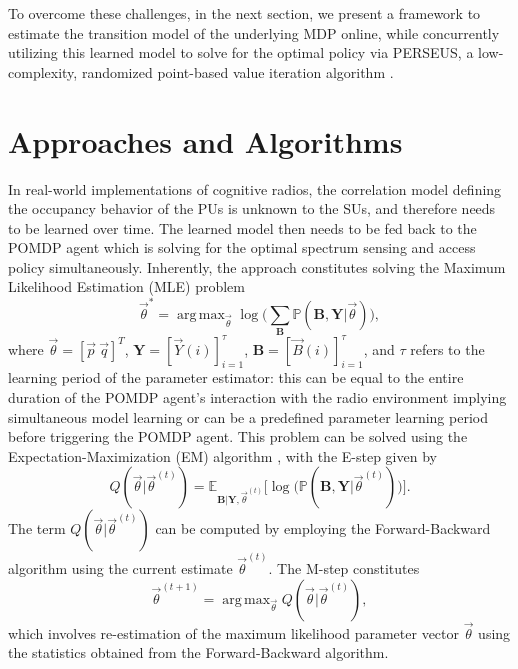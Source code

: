 \documentclass[10pt,twocolumn]{IEEEtran}
\DeclareMathOperator*{\argmax}{arg\,max}
\begin{document}
To overcome these challenges, in the next section, we present a framework to estimate the transition model of the underlying MDP online, while concurrently utilizing this learned model to solve for the optimal policy via PERSEUS, a low-complexity, randomized point-based value iteration algorithm \cite{DBLP:journals/corr/abs-1109-2145}.
\vspace{-4mm}
\section{Approaches and Algorithms}\label{III}
In real-world implementations of cognitive radios, the correlation model defining the occupancy behavior of the PUs is unknown to the SUs, and therefore needs to be learned over time. The learned model then needs to be fed back to the POMDP agent which is solving for the optimal spectrum sensing and access policy simultaneously. Inherently, the approach constitutes solving the Maximum Likelihood Estimation (MLE) problem
\begin{equation}\label{17}
\vec{\theta}^{*} = \argmax_{\vec{\theta}} \log\Big(\sum_{\mathbf{B}} \mathbb{P}(\mathbf{B}, \mathbf{Y}| \vec{\theta})\Big),
\end{equation}
where $\vec{\theta}{=}[\vec{p}\ \vec{q}]^{T}$, $\mathbf{Y}=[\vec{Y}(i)]_{i{=}1}^{\tau}$, $\mathbf{B}=[\vec{B}(i)]_{i{=}1}^{\tau}$,
and $\tau$ refers to the learning period of the parameter estimator: this can be equal to the entire duration of the POMDP agent's interaction with the radio environment implying simultaneous model learning or can be a predefined parameter learning period before triggering the POMDP agent.
This problem can be solved using the Expectation-Maximization (EM) algorithm \cite{778361}, with the E-step given by
\begin{equation}
    Q(\vec{\theta}|\vec{\theta}^{(t)}) = \mathbb{E}_{\mathbf{B}|\mathbf{Y}, \vec{\theta}^{(t)}} \Big[ \log \Big(\mathbb{P}(\mathbf{B}, \mathbf{Y}|\vec{\theta}^{(t)})\Big)\Big].
\end{equation}
The term $Q(\vec{\theta}|\vec{\theta}^{(t)})$ can be computed by employing the Forward-Backward algorithm \cite{778361} using the current estimate $\vec{\theta}^{(t)}$. The M-step constitutes
\begin{equation}
\vec{\theta}^{(t+1)}
 = \argmax_{\vec{\theta}} Q(\vec{\theta}|\vec{\theta}^{(t)}),
\end{equation}
which involves re-estimation of the maximum likelihood parameter vector $\vec{\theta}$ using the statistics obtained from the Forward-Backward algorithm.
\end{document}
